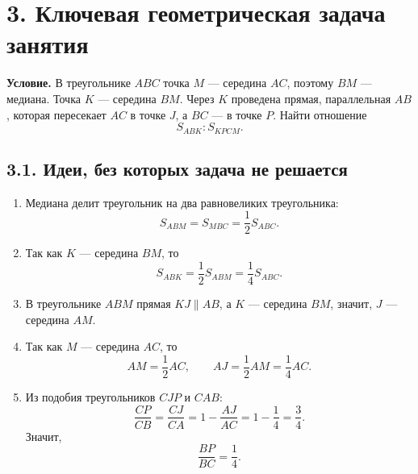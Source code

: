 \documentclass[a4paper,12pt]{article}
\begin{document}
\begin{center}
\end{center}

\section*{3. Ключевая геометрическая задача занятия}

\textbf{Условие.}
В треугольнике \(ABC\) точка \(M\) --- середина \(AC\), поэтому \(BM\) --- медиана.
Точка \(K\) --- середина \(BM\).
Через \(K\) проведена прямая, параллельная \(AB\), которая пересекает \(AC\) в точке \(J\), а \(BC\) --- в точке \(P\).
Найти отношение
\[
S_{ABK}:S_{KPCM}.
\]

\subsection*{3.1. Идеи, без которых задача не решается}
\begin{enumerate}
  \item Медиана делит треугольник на два равновеликих треугольника:
  \[
  S_{ABM}=S_{MBC}=\frac12 S_{ABC}.
  \]
  \item Так как \(K\) --- середина \(BM\), то
  \[
  S_{ABK}=\frac12 S_{ABM}=\frac14 S_{ABC}.
  \]
  \item В треугольнике \(ABM\) прямая \(KJ\parallel AB\), а \(K\) --- середина \(BM\), значит, \(J\) --- середина \(AM\).
  \item Так как \(M\) --- середина \(AC\), то
  \[
  AM=\frac12 AC,\qquad AJ=\frac12 AM=\frac14 AC.
  \]
  \item Из подобия треугольников \(CJP\) и \(CAB\):
  \[
  \frac{CP}{CB}=\frac{CJ}{CA}=1-\frac{AJ}{AC}=1-\frac14=\frac34.
  \]
  Значит,
  \[
  \frac{BP}{BC}=\frac14.
  \]
\end{enumerate}
\end{document}
